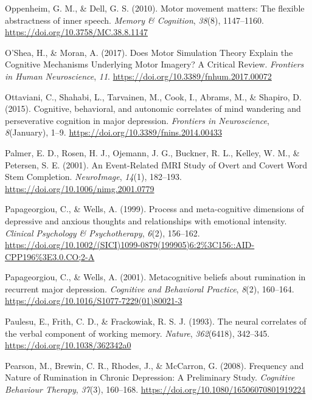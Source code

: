\documentclass[a4paper,12pt,twoside,openright,oldfontcommands]{memoir}
\begin{document}
\leavevmode\hypertarget{ref-oppenheim_motor_2010}{}%
Oppenheim, G. M., \& Dell, G. S. (2010). Motor movement matters: The flexible abstractness of inner speech. \emph{Memory \& Cognition}, \emph{38}(8), 1147--1160. \url{https://doi.org/10.3758/MC.38.8.1147}

\leavevmode\hypertarget{ref-oshea_does_2017}{}%
O'Shea, H., \& Moran, A. (2017). Does Motor Simulation Theory Explain the Cognitive Mechanisms Underlying Motor Imagery? A Critical Review. \emph{Frontiers in Human Neuroscience}, \emph{11}. \url{https://doi.org/10.3389/fnhum.2017.00072}

\leavevmode\hypertarget{ref-Ottaviani2015}{}%
Ottaviani, C., Shahabi, L., Tarvainen, M., Cook, I., Abrams, M., \& Shapiro, D. (2015). Cognitive, behavioral, and autonomic correlates of mind wandering and perseverative cognition in major depression. \emph{Frontiers in Neuroscience}, \emph{8}(January), 1--9. \url{https://doi.org/10.3389/fnins.2014.00433}

\leavevmode\hypertarget{ref-palmer_event-related_2001}{}%
Palmer, E. D., Rosen, H. J., Ojemann, J. G., Buckner, R. L., Kelley, W. M., \& Petersen, S. E. (2001). An Event-Related fMRI Study of Overt and Covert Word Stem Completion. \emph{NeuroImage}, \emph{14}(1), 182--193. \url{https://doi.org/10.1006/nimg.2001.0779}

\leavevmode\hypertarget{ref-papageorgiou_process_1999}{}%
Papageorgiou, C., \& Wells, A. (1999). Process and meta-cognitive dimensions of depressive and anxious thoughts and relationships with emotional intensity. \emph{Clinical Psychology \& Psychotherapy}, \emph{6}(2), 156--162. \url{https://doi.org/10.1002/(SICI)1099-0879(199905)6:2\%3C156::AID-CPP196\%3E3.0.CO;2-A}

\leavevmode\hypertarget{ref-papageorgiou_metacognitive_2001}{}%
Papageorgiou, C., \& Wells, A. (2001). Metacognitive beliefs about rumination in recurrent major depression. \emph{Cognitive and Behavioral Practice}, \emph{8}(2), 160--164. \url{https://doi.org/10.1016/S1077-7229(01)80021-3}

\leavevmode\hypertarget{ref-paulesu_neural_1993}{}%
Paulesu, E., Frith, C. D., \& Frackowiak, R. S. J. (1993). The neural correlates of the verbal component of working memory. \emph{Nature}, \emph{362}(6418), 342--345. \url{https://doi.org/10.1038/362342a0}

\leavevmode\hypertarget{ref-pearson_frequency_2008}{}%
Pearson, M., Brewin, C. R., Rhodes, J., \& McCarron, G. (2008). Frequency and Nature of Rumination in Chronic Depression: A Preliminary Study. \emph{Cognitive Behaviour Therapy}, \emph{37}(3), 160--168. \url{https://doi.org/10.1080/16506070801919224}
\end{document}
